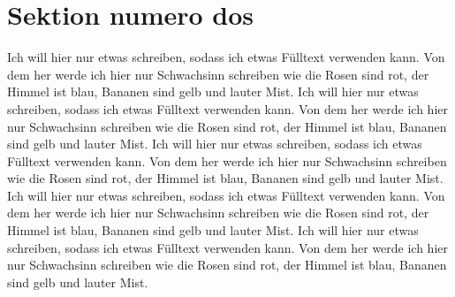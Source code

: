 
\section*{Sektion numero dos}

Ich will hier nur etwas schreiben, sodass ich etwas Fülltext verwenden kann. Von dem her werde ich hier nur Schwachsinn schreiben wie die Rosen sind rot, der Himmel ist blau, Bananen sind gelb und lauter Mist. Ich will hier nur etwas schreiben, sodass ich etwas Fülltext verwenden kann. Von dem her werde ich hier nur Schwachsinn schreiben wie die Rosen sind rot, der Himmel ist blau, Bananen sind gelb und lauter Mist. Ich will hier nur etwas schreiben, sodass ich etwas Fülltext verwenden kann. Von dem her werde ich hier nur Schwachsinn schreiben wie die Rosen sind rot, der Himmel ist blau, Bananen sind gelb und lauter Mist. Ich will hier nur etwas schreiben, sodass ich etwas Fülltext verwenden kann. Von dem her werde ich hier nur Schwachsinn schreiben wie die Rosen sind rot, der Himmel ist blau, Bananen sind gelb und lauter Mist. Ich will hier nur etwas schreiben, sodass ich etwas Fülltext verwenden kann. Von dem her werde ich hier nur Schwachsinn schreiben wie die Rosen sind rot, der Himmel ist blau, Bananen sind gelb und lauter Mist. 